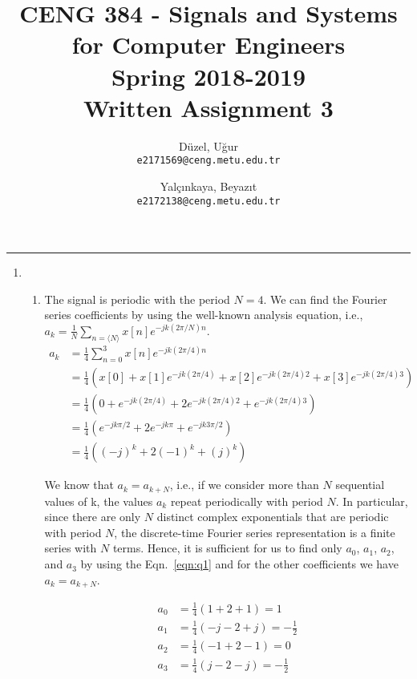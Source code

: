 \documentclass[10pt,a4paper, margin=1in]{article}
\author{
  Düzel, Uğur\\
  \texttt{e2171569@ceng.metu.edu.tr}
  \and
  Yalçınkaya, Beyazıt\\
  \texttt{e2172138@ceng.metu.edu.tr}
}
\title{CENG 384 - Signals and Systems for Computer Engineers \\
Spring 2018-2019 \\
Written Assignment 3}
\begin{document}
\maketitle



\noindent\rule{19cm}{1.2pt}

\begin{enumerate}

\item 
    \begin{enumerate}
    \item The signal is periodic with the period $N = 4$. We can find the Fourier series coefficients by using the well-known analysis equation, i.e., $a_k = \frac{1}{N} \sum_{n = \langle N \rangle} x[n] e^{-jk(2\pi/N)n}$.
    \begin{equation}\label{eqn:q1}
    \begin{split}
    	a_k & = \frac{1}{4} \sum_{n = 0}^{3} x[n] e^{-jk(2\pi/4)n}\\
	       & = \frac{1}{4} \left( x[0] + x[1]e^{-jk(2\pi/4)} + x[2] e^{-jk(2\pi/4)2} + x[3] e^{-jk(2\pi/4)3} \right)\\
	       & = \frac{1}{4} \left( 0 + e^{-jk(2\pi/4)} + 2 e^{-jk(2\pi/4)2} + e^{-jk(2\pi/4)3} \right)\\
	       & = \frac{1}{4} \left(e^{-jk\pi/2} + 2 e^{-jk\pi} + e^{-jk3\pi/2} \right)\\
	       & = \frac{1}{4} \left( (-j)^k + 2(-1)^k + (j)^k \right)
    \end{split}
    \end{equation}
    
    We know that $a_k = a_{k + N}$, i.e., if we consider more than $N$ sequential values of k, the values $a_k$ repeat periodically with period $N$. In particular, since there are only $N$ distinct complex exponentials that are periodic with period $N$, the discrete-time Fourier series representation is a finite series with $N$ terms. Hence, it is sufficient for us to find only $a_0$, $a_1$, $a_2$, and $a_3$ by using the Eqn.~\ref{eqn:q1} and for the other coefficients we have $a_k = a_{k + N}$.
    
    \begin{equation}
    \begin{split}
    	a_0 & = \frac{1}{4} \left(1 + 2 + 1 \right) = 1\\
    	a_1 & = \frac{1}{4} \left(-j-2+j \right) = -\frac{1}{2}\\
    	a_2 & = \frac{1}{4} \left(-1+2-1 \right) = 0\\
    	a_3 & = \frac{1}{4} \left( j-2-j \right) = -\frac{1}{2}
    \end{split}
    \end{equation}
    

\end{enumerate}
\end{enumerate}
\end{document}
